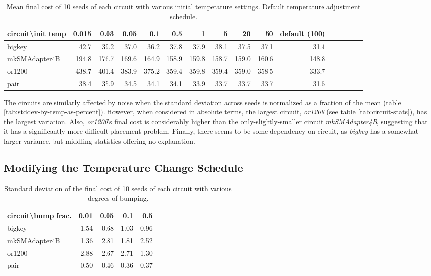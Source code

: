 \documentclass[11pt]{article}
\begin{document}
\begin{table}
\centering
\begin{tabular}{l | *{15}r}
\hline\hline
circuit\textbackslash init temp & 0.015 & 0.03 & 0.05 & 0.1 & 0.5 & 1 & 5 & 20 & 50 & default (100)\\
\hline
bigkey & 42.7 & 39.2 & 37.0 & 36.2 & 37.8 & 37.9 & 38.1 & 37.5 & 37.1 & 31.4 \\
mkSMAdapter4B & 194.8 & 176.7 & 169.6 & 164.9 & 158.9 & 159.8 & 158.7 & 159.0 & 160.6 & 148.8 \\
or1200 & 438.7 & 401.4 & 383.9 & 375.2 & 359.4 & 359.8 & 359.4 & 359.0 & 358.5 & 333.7 \\
pair & 38.4 & 35.9 & 34.5 & 34.1 & 34.1 & 33.9 & 33.7 & 33.7 & 33.7 & 31.5 \\
\hline\hline
\end{tabular}
\caption{Mean final cost of 10 seeds of each circuit with various initial temperature settings. Default temperature adjustment schedule. }
\label{tab:mean-by-temp}
\end{table}

The circuits are similarly affected by noise when the standard deviation across seeds is normalized as a fraction of the mean (table \ref{tab:stddev-by-temp-as-percent}). However, when considered in absolute terms, the largest circuit, \emph{or1200} (see table \ref{tab:circuit-stats}), has the largest variation. Also, \emph{or1200}'s final cost is considerably higher than the only-slightly-smaller circuit \emph{mkSMAdapter4B}, suggesting that it has a significantly more difficult placement problem. Finally, there seems to be some dependency on circuit, as \emph{bigkey} has a somewhat larger variance, but middling statistics offering no explanation.

\subsection{Modifying the Temperature Change Schedule}

\begin{table}
\centering
\begin{tabular}{l | *{15}r}
\hline\hline
circuit\textbackslash bump frac. & 0.01 & 0.05 & 0.1 & 0.5 \\
\hline
bigkey & 1.54 & 0.68 & 1.03 & 0.96 \\
mkSMAdapter4B & 1.36 & 2.81 & 1.81 & 2.52 \\
or1200 & 2.88 & 2.67 & 2.71 & 1.30 \\
pair & 0.50 & 0.46 & 0.36 & 0.37 \\
\hline\hline
\end{tabular}
\caption{Standard deviation of the final cost of 10 seeds of each circuit with various degrees of bumping. }
\label{tab:stddev-by-temp-bump}
\end{table}
\end{document}
